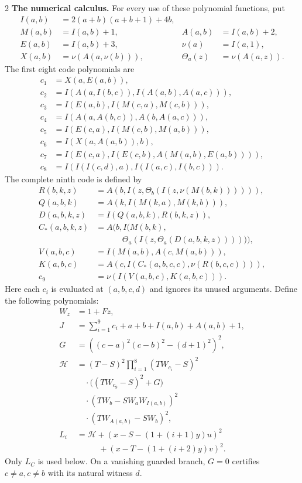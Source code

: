 \documentclass[10pt,letterpaper]{article}
\newcommand{\HH}{\mathcal H}
\begin{document}
\begin{multicols}{2}
\textbf{The numerical calculus.}
For every use of these polynomial functions, put
\[
\begin{aligned}
I(a,b)&=2(a+b)(a+b+1)+4b,\\
M(a,b)&=I(a,b)+1,&A(a,b)&=I(a,b)+2,\\
E(a,b)&=I(a,b)+3,&\nu(a)&=I(a,1),\\
X(a,b)&=\nu(A(a,\nu(b))),&
\Theta_a(z)&=\nu(A(a,z)).
\end{aligned}
\]
The first eight code polynomials are
\[
\begin{aligned}
c_1&=X(a,E(a,b)),\\
c_2&=I(A(a,I(b,c)),I(A(a,b),A(a,c))),\\
c_3&=I(E(a,b),I(M(c,a),M(c,b))),\\
c_4&=I(A(a,A(b,c)),A(b,A(a,c))),\\
c_5&=I(E(c,a),I(M(c,b),M(a,b))),\\
c_6&=I(X(a,A(a,b)),b),\\
c_7&=I(E(c,a),I(E(c,b),A(M(a,b),E(a,b)))),\\
c_8&=I(I(I(c,d),a),I(I(a,c),I(b,c))).
\end{aligned}
\]
The complete ninth code is defined by
\[
\begin{aligned}
R(b,k,z)&=A(b,I(z,\Theta_b(I(z,\nu(M(b,k)))))),\\
Q(a,b,k)&=A(k,I(M(k,a),M(k,b))),\\
D(a,b,k,z)&=I(Q(a,b,k),R(b,k,z)),\\
C_*(a,b,k,z)&=A\bigl(b,I(M(b,k),\\[-2pt]
&\hspace{39pt}\Theta_a(I(z,\Theta_a(D(a,b,k,z)))))\bigr),\\
V(a,b,c)&=I(M(a,b),A(c,M(a,b))),\\
K(a,b,c)&=A(c,I(C_*(a,b,c,c),\nu(R(b,c,c)))),\\
c_9&=\nu(I(V(a,b,c),K(a,b,c))).
\end{aligned}
\]
Here each $c_i$ is evaluated at $(a,b,c,d)$ and ignores its unused
arguments. Define the following polynomials:
\[
\begin{aligned}
W_z&=1+Fz,\\
J&=\sum_{i=1}^9c_i+a+b+I(a,b)+A(a,b)+1,\\
G&=((c-a)^2(c-b)^2-(d+1)^2)^2,\\
\HH&=(T-S)^2\prod_{i=1}^8(TW_{c_i}-S)^2\\
&\quad\cdot\bigl((TW_{c_9}-S)^2+G\bigr)\\
&\quad\cdot(TW_b-SW_aW_{I(a,b)})^2\\
&\quad\cdot(TW_{A(a,b)}-SW_b)^2,\\
L_i&=\HH+(x-S-(1+(i+1)y)u)^2\\
&\hspace{32pt}+(x-T-(1+(i+2)y)v)^2.
\end{aligned}
\]
Only $L_C$ is used below. On a vanishing guarded branch, $G=0$
certifies $c\ne a,c\ne b$ with its natural witness $d$.


\end{multicols}
\end{document}
